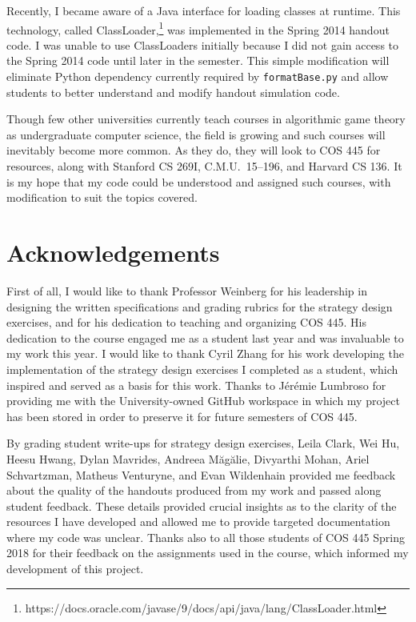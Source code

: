 \documentclass[pageno]{jpaper}
\begin{document}
Recently, I became aware of a Java interface for loading classes at runtime.
This technology, called ClassLoader,\footnote{https://docs.oracle.com/javase/9/docs/api/java/lang/ClassLoader.html} was implemented in the Spring 2014 handout code.
I was unable to use ClassLoaders initially because I did not gain access to the Spring 2014 code until later in the semester.
This simple modification will eliminate Python dependency currently required by \texttt{formatBase.py} and allow students to better understand and modify handout simulation code.

Though few other universities currently teach courses in algorithmic game theory as undergraduate computer science, the field is growing and such courses will inevitably become more common.
As they do, they will look to COS 445 for resources, along with Stanford CS 269I, C.M.U.\ 15--196, and Harvard CS 136.
It is my hope that my code could be understood and assigned such courses, with modification to suit the topics covered.

\section*{Acknowledgements}
First of all, I would like to thank Professor Weinberg for his leadership in designing the written specifications and grading rubrics for the strategy design exercises, and for his dedication to teaching and organizing COS 445.
His dedication to the course engaged me as a student last year and was invaluable to my work this year.
I would like to thank Cyril Zhang for his work developing the implementation of the strategy design exercises I completed as a student, which inspired and served as a basis for this work.
Thanks to J\'er\'emie Lumbroso for providing me with the University-owned GitHub workspace in which my project has been stored in order to preserve it for future semesters of COS 445.

By grading student write-ups for strategy design exercises, Leila Clark, Wei Hu, Heesu Hwang, Dylan Mavrides, Andreea M\u{a}g\u{a}lie, Divyarthi Mohan, Ariel Schvartzman, Matheus Venturyne, and Evan Wildenhain provided me feedback about the quality of the handouts produced from my work and passed along student feedback.
These details provided crucial insights as to the clarity of the resources I have developed and allowed me to provide targeted documentation where my code was unclear.
Thanks also to all those students of COS 445 Spring 2018 for their feedback on the assignments used in the course, which informed my development of this project.
\end{document}

